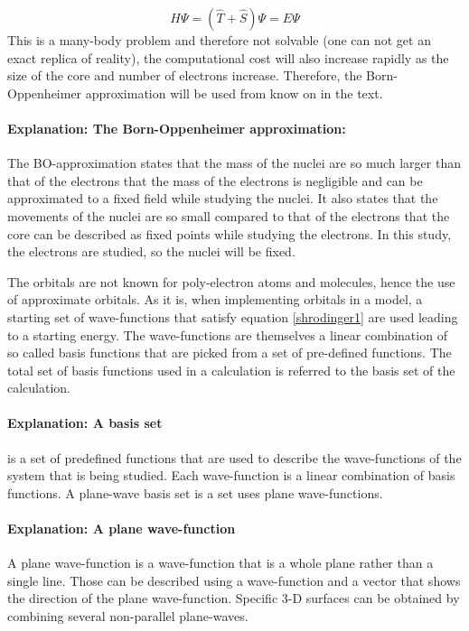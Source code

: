 \documentclass[10pt,a4paper]{article}
\begin{document}
\begin{equation} \label{shrodinger1}
H \Psi = ( \hat{T} + \hat{S}) \Psi = E \Psi
\end{equation}
This is a many-body problem and therefore not solvable (one can not get an exact replica of reality), the computational cost will also increase rapidly as the size of the core and number of electrons increase. Therefore, the Born-Oppenheimer approximation will be used from know on in the text.

\paragraph{Explanation: The Born-Oppenheimer approximation:}
The BO-approximation states that the mass of the nuclei are so much larger than that of the electrons that the mass of the electrons is negligible and can be approximated to a fixed field while studying the nuclei. It also states that the movements of the nuclei are so small compared to that of the electrons that the core can be described as fixed points while studying the electrons. In this study, the electrons are studied, so the nuclei will be fixed. 

 The orbitals are not known for poly-electron atoms and molecules, hence the use of approximate orbitals. As it is, when implementing orbitals in a model,  a starting set of wave-functions that satisfy equation \ref{shrodinger1} are used leading to a starting energy. The wave-functions are themselves a linear combination of so called basis functions that are picked from a set of pre-defined functions. The total set of basis functions used in a calculation is referred to the basis set of the calculation. 

\paragraph{Explanation: A basis set} is a set of predefined functions that are used to describe the wave-functions of the system that is being studied. Each wave-function is a linear combination of basis functions. \cite{burke} A plane-wave basis set is a set uses plane wave-functions.

\paragraph{Explanation: A plane wave-function}
A plane wave-function  is a wave-function that is a whole plane rather than a single line. Those can be described using a wave-function and a vector that shows the direction of the plane wave-function. Specific 3-D surfaces can be obtained by combining several non-parallel plane-waves. 
\end{document}

